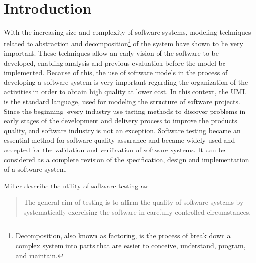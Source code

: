 \chapter{Introduction}

With the increasing size and complexity of software systems, modeling techniques related to abstraction
and decomposition\footnote{Decomposition, also known as factoring, is the process of break down a complex system
into parts that are easier to conceive, understand, program, and maintain.}\cite{struct-analy} of the system have
shown to be very important\cite{dicsbuchs06}.
These techniques allow an early vision of the software to be developed, enabling analysis and previous evaluation before
the model be implemented.
Because of this, the use of software models in the process of developing a software system is very important regarding
the organization of the activities in order to obtain high quality at lower cost.
In this context, the \ac{UML} is the standard language, used for modeling the structure of software projects.\\

Since the beginning, every industry use testing methods to discover problems in early stages of the development and delivery
process to improve the products quality, and software industry is not an exception.
Software testing became an essential method for software quality assurance and became widely used
and accepted for the validation and verification of software systems.
It can be considered as a complete revision of the specification, design and implementation of a software system.

Miller\cite{miller} describe the utility of software testing as:

\begin{quotation}
The general aim of testing is to affirm the quality of software systems by systematically
exercising the software in carefully controlled circumstances.
\end{quotation}

